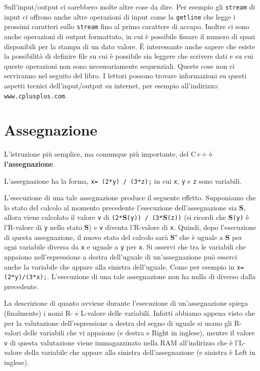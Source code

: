 \documentclass[a4paper,12pt]{book}
\begin{document}
Sull'input/output ci sarebbero molte altre cose da dire.
Per esempio gli \texttt{stream} di input ci offrono anche altre operazioni di input come la \texttt{getline} che legge i prossimi caratteri sullo \texttt{stream} fino al primo carattere di accapo.
Inoltre ci so­no anche operazioni di output formattato, in cui è possibile fissare il numero di spazi disponibili per la stampa di un dato valore.
È interessante anche sapere che esiste la possibilità di definire file su cui è possibile sia leggere che scrivere dati e su cui queste operazioni non sono necessariamente sequenziali.
Queste cose non ci serviranno nel seguito del libro.
I lettori possono trovare informazioni su questi aspetti tecnici dell'input/output su internet, per esempio all'indirizzo: \texttt{www.cplusplus.com}. 

\section{Assegnazione}
L'istruzione più semplice, ma comunque più importante, del C++ è \textbf{l'assegnazione}.

\noindent L'assegnazione ha la forma, \texttt{x= (2*y) / (3*z);} in cui \texttt{x}, \texttt{y} e \texttt{z} sono variabili.

\noindent L'esecuzione di una tale assegnazione produce il seguente effetto. Supponiamo che lo stato del calcolo al momento precedente l'esecuzione dell'assegnazione sia \textbf{S}, allora viene calcolato il valore \texttt{v} di \texttt{(2*}\textbf{S}\texttt{(y)) / (3*}\textbf{S}\texttt{(z))} (si ricordi che \textbf{S}\texttt{(y)} è l'R-valore di \texttt{y} nello stato \textbf{S}) e \texttt{v} diventa l'R-valore di \texttt{x}.
Quindi, dopo l'esecuzione di questa assegnazione, il nuovo stato del calcolo sarà \textbf{S'} che è uguale a \textbf{S} per ogni variabile diversa da \texttt{x} e uguale a \texttt{y} per \texttt{x}.
Si osservi che tra le variabili che appaiono nell'espressione a destra dell'uguale di un'assegnazione può esserci anche la variabile che appare alla sinistra dell'uguale.
Come per esempio in \texttt{x=(2*y)/(3*x);}.
L'esecuzione di una tale assegnazione non ha nulla di diverso dalla precedente. 

La descrizione di quanto avviene durante l'esecuzione di un'assegnazione spiega (finalmente) i nomi R- e L-valore delle variabili.
Infatti abbiamo appena visto che per la valutazione dell'espressione a destra del segno di uguale si usano gli R-valori delle variabili che vi appaiono (e destra e Right in inglese),
 mentre il valore \texttt{v} di questa valutazione viene immagazzinato nella RAM all'indirizzo che è l'L-valore della variabile che appare alla sinistra dell'assegnazione (e sinistra è Left in inglese). 
\end{document}
